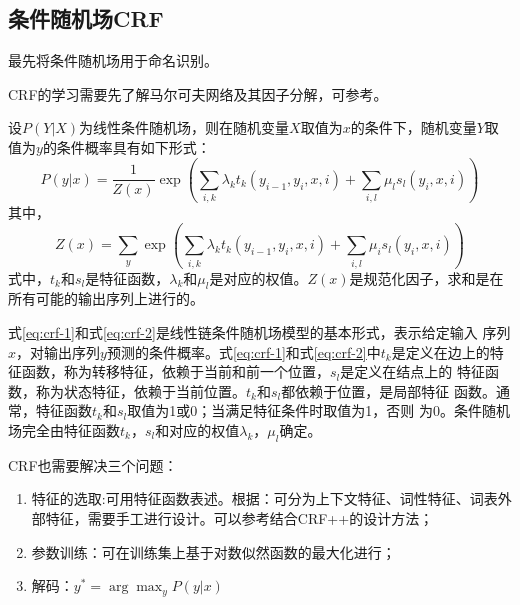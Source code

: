 \documentclass[a4paper,UTF8,no-math]{ctexart}
\begin{document}
	\subsection{条件随机场CRF}
	
	\citep{lafferty2001conditional}最先将条件随机场用于命名识别。
	
	CRF的学习需要先了解马尔可夫网络及其因子分解，可参考\citep{李航2012统计学习方法}。
	
	设$P(Y|X)$为线性条件随机场，则在随机变量$X$取值为$x$的条件下，随机变量$Y$取值为$y$的条件概率具有如下形式：\begin{equation}
P(y | x)=\frac{1}{Z(x)} \exp \left(\sum_{i, k} \lambda_{k} t_{k}\left(y_{i-1},y_{i}, x, i\right)+\sum_{i, l} \mu_{l} s_{l}\left(y_{i}, x, i\right)\right)
\label{eq:crf-1}
	\end{equation}
	其中，\begin{equation}
Z(x)=\sum_{y} \exp \left(\sum_{i, k} \lambda_{k} t_{k}\left(y_{i-1}, y_{i}, x, i\right)+\sum_{i, l} \mu_{i} s_{l}\left(y_{i}, x, i\right)\right)
\label{eq:crf-2}
	\end{equation}
	式中，$t_{k}$和$s_{l}$是特征函数，$\lambda_{k}$和$\mu_{l}$是对应的权值。$Z(x)$是规范化因子，求和是在所有可能的输出序列上进行的。
	
	式\eqref{eq:crf-1}和式\eqref{eq:crf-2}是线性链条件随机场模型的基本形式，表示给定输入
序列$x$，对输出序列$y$预测的条件概率。式\eqref{eq:crf-1}和式\eqref{eq:crf-2}中$t_{k}$是定义在边上的特征函数，称为转移特征，依赖于当前和前一个位置，$s_{l}$是定义在结点上的
特征函数，称为状态特征，依赖于当前位置。$t_{k}$和$s_{l}$都依赖于位置，是局部特征
函数。通常，特征函数$t_{k}$和$s_{l}$取值为1或0；当满足特征条件时取值为1，否则
为0。条件随机场完全由特征函数$t_{k}$，$s_{l}$和对应的权值$\lambda_{k}$，$\mu_{l}$确定。

	CRF也需要解决三个问题：
	\begin{enumerate}
		\item 特征的选取:可用特征函数表述。根据\citep{_crf_2010}：可分为上下文特征、词性特征、词表外部特征，需要手工进行设计。可以参考\citep{noauthor_crf_nodate}结合CRF++的设计方法；
		\item 参数训练：可在训练集上基于对数似然函数的最大化进行；
		\item 解码：$y^{*} = \arg \max_{y} P(y|x)$
	\end{enumerate}
	
\end{document}
